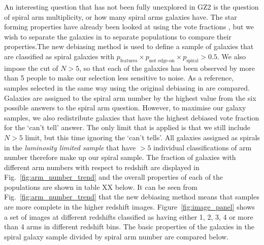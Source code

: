 \documentclass[useAMS,usenatbib]{mn2e}
\begin{document}
An interesting question that has not been fully unexplored in GZ2 is the question of spiral arm multiplicity, or how many spiral arms galaxies have. The star forming properties have already been looked at using the vote fractions \citep{Willett_15}, but we wish to separate the galaxies in to separate populations to compare their properties.The new debiasing method is used to define a sample of galaxies that are classified as spiral galaxies with $p_{\textrm{features}} \times p_{\textrm{not edge-on}} \times p_{\textrm{spiral}} > 0.5$. We also impose the cut of $N>5$, so that each of the galaxies has been observed by more than 5 people to make our selection less sensitive to noise. As a reference, samples selected in the same way using the original debiasing in \citet{Willett_13} are compared. Galaxies are assigned to the spiral arm number by the highest value from the six possible answers to the spiral arm question. However, to maximise our galaxy samples, we also redistribute galaxies that have the highest debiased vote fraction for the `can't tell' answer. The only limit that is applied is that we still include $N>5$ limit, but this time ignoring the `can't tells'. All galaxies assigned as spirals in the \textit{luminosity limited sample} that have $>5$ individual classifications of arm number therefore make up our spiral sample. The fraction of galaxies with different arm numbers with respect to redshift are displayed in Fig.~\ref{fig:arm_number_trend} and the overall properties of each of the populations are shown in table XX below. It can be seen from Fig.~\ref{fig:arm_number_trend} that the new debiasing method means that samples are more complete in the higher redshift images. Figure~\ref{fig:image_panel} shows a set of images at different redshifts classified as having either 1, 2, 3, 4 or more than 4 arms in different redshift bins. The basic properties of the galaxies in the spiral galaxy sample divided by spiral arm number are compared below.
\end{document}
